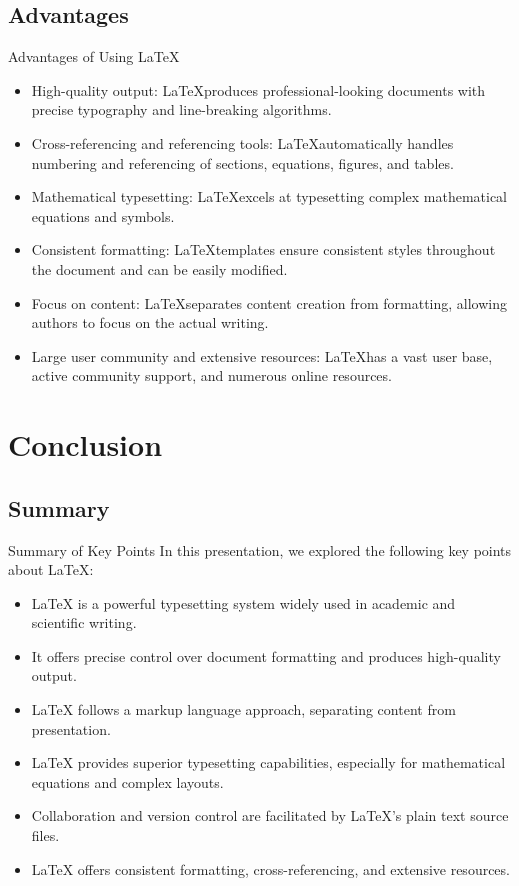 \documentclass[aspectratio=169]{SUSTechBeamer}
\begin{document}
\subsection{Advantages}
\begin{frame}{Advantages of Using \LaTeX}
    \begin{itemize}
      \item High-quality output: \LaTeX produces professional-looking documents with precise typography and line-breaking algorithms.
      \item Cross-referencing and referencing tools: \LaTeX automatically handles numbering and referencing of sections, equations, figures, and tables.
      \item Mathematical typesetting: \LaTeX excels at typesetting complex mathematical equations and symbols.
      \item Consistent formatting: \LaTeX templates ensure consistent styles throughout the document and can be easily modified.
      \item Focus on content: \LaTeX separates content creation from formatting, allowing authors to focus on the actual writing.
      \item Large user community and extensive resources: \LaTeX has a vast user base, active community support, and numerous online resources.
    \end{itemize}
\end{frame}


\section{Conclusion}

\subsection{Summary}
\begin{frame}{Summary of Key Points}
In this presentation, we explored the following key points about LaTeX:

\begin{itemize}
    \item LaTeX is a powerful typesetting system widely used in academic and scientific writing.
    \item It offers precise control over document formatting and produces high-quality output.
    \item LaTeX follows a markup language approach, separating content from presentation.
    \item LaTeX provides superior typesetting capabilities, especially for mathematical equations and complex layouts.
    \item Collaboration and version control are facilitated by LaTeX's plain text source files.
    \item LaTeX offers consistent formatting, cross-referencing, and extensive resources.
\end{itemize}
\end{frame}
\end{document}
